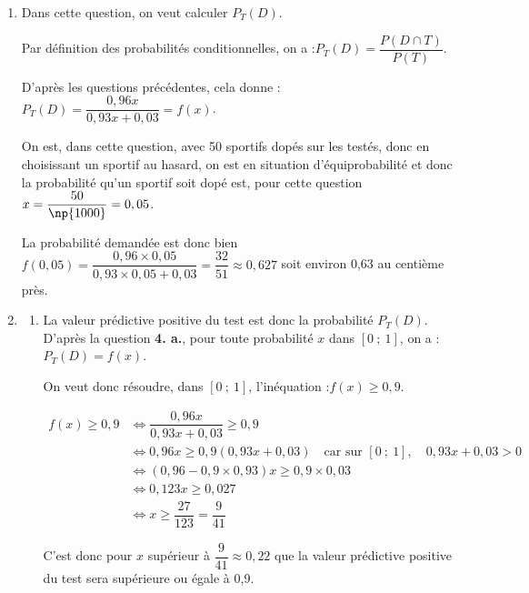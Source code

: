 \begin{enumerate}
$\begin{aligned} P(T) &= P(D \cap T) + P(\overline{D} \cap T)\\
&= 0,96x + (1 - x) \times 0,03\\
&= 0,96x + 0,03 - 0,03x\\
&= 0,93x + 0,03\end{aligned}$

On arrive bien à la probabilité annoncée.

		\item Dans cette question, on veut calculer $P_T(D)$.

Par définition des probabilités conditionnelles, on a :\quad $P_T(D) = \dfrac{P(D \cap T)}{P(T)}$.

D'après les questions précédentes, cela donne :\quad $P_T(D) = \dfrac{0,96x}{0,93x + 0,03} = f(x)$.

On est, dans cette question, avec 50 sportifs dopés sur les  testés, donc en choisissant un sportif au hasard, on est en situation d'équiprobabilité et donc la probabilité qu'un sportif soit dopé est, pour cette question $x = \dfrac{50}{\np{1000}} = 0,05$.

La probabilité demandée est donc bien $f(0,05) = \dfrac{0,96 \times 0,05}{0,93\times 0,05 + 0,03} = \dfrac{32}{51}\approx 0,627$ soit environ 0,63 au centième près.

		\item \begin{enumerate}
			\item La valeur prédictive positive du test est donc la probabilité $P_T(D)$. D'après la question \textbf{4. a.}, pour toute probabilité $x$ dans $ [0~;~1] $, on a :\quad $P_T(D)= f(x)$.

On veut donc résoudre, dans $ [0~;~1] $, l'inéquation :\quad $f(x) \geqslant 0,9$.

$\begin{aligned} f(x) \geqslant 0,9&\iff \dfrac{0,96x}{0,93x + 0,03 } \geqslant 0,9\\
&\iff 0,96x \geqslant 0,9 (0,93x+0,03) \quad \text{car sur } [0~;~1],\quad 0,93x + 0,03 >0\\
&\iff (0,96 - 0,9\times 0,93)x \geqslant 0,9\times 0,03\\
&\iff 0,123x \geqslant 0,027\\
&\iff x \geqslant \dfrac{27}{123}	=\dfrac{9}{41 }	\end{aligned} $

C'est donc pour $x$ supérieur à $ \dfrac{9}{41} \approx 0,22$ que la valeur prédictive positive du test sera supérieure ou égale à 0,9.


\end{enumerate}
\end{enumerate}
